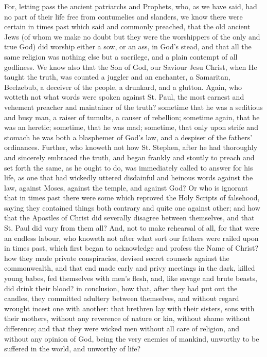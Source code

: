 For, letting pass the ancient patriarchs and Prophets, who, as we
have said, had no part of their life free from contumelies and slanders,
we know
there were certain in times past which said and commonly preached, that
the old ancient Jews (of whom we make no doubt but they were the worshippers
of the only and true God) did worship either a sow, or an ass, in God’s
stead, and that all the same religion was nothing else but a sacrilege,
and a plain contempt of all godliness. We know also that the Son
of God, our Saviour Jesu Christ, when He taught the truth, was counted
a juggler and an enchanter, a Samaritan, Beelzebub, a deceiver of the
people, a drunkard, and a glutton. Again, who wotteth not what
words were spoken against St. Paul, the most earnest and vehement preacher
and maintainer of the truth? sometime that he was a seditious and busy
man, a raiser of tumults, a causer of rebellion; sometime again, that
he was an heretic; sometime, that he was mad; sometime, that only upon
strife and stomach he was both a blasphemer of God’s law, and
a despiser of the fathers’ ordinances. Further, who knoweth
not how St. Stephen, after he had thoroughly and sincerely embraced
the truth, and began frankly and stoutly to preach and set forth the
same, as he ought to do, was immediately called to answer for his life,
as one that had wickedly uttered disdainful and heinous words against
the law, against Moses, against the temple, and
against God? Or who is ignorant that in times past there were
some which reproved the Holy Scripts of falsehood, saying they contained
things both contrary and quite one against other; and how that the Apostles
of Christ did severally disagree between themselves, and that St. Paul
did vary from them all? And, not to make rehearsal of all, for
that were an endless labour, who knoweth not after what sort our fathers
were railed upon in times past, which first began to acknowledge and
profess the Name of Christ? how they made private conspiracies, devised
secret counsels against the commonwealth, and that end made early and
privy meetings in the dark, killed young babes, fed themselves with
men’s flesh, and, like savage and brute beasts, did drink their
blood? in conclusion, how that, after they had put out the candles,
they committed adultery between themselves, and without regard wrought
incest one with another: that brethren lay with their sisters, sons
with their mothers, without any reverence of nature or kin, without
shame without difference; and that they were wicked men without all
care of religion, and without any opinion of God, being the very enemies
of mankind, unworthy to be suffered in the world, and unworthy of life?

